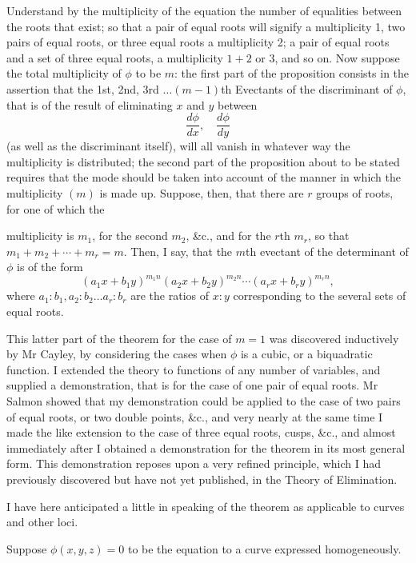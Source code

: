 \documentclass[11pt]{article}
\newcommand{\sourcepage}[1]{\marginpar{\scriptsize p.~#1}}
\begin{document}
{{Understand by the multiplicity of the equation the number of equalities between the roots that exist; so that a pair of equal roots will signify a multiplicity 1, two pairs of equal roots, or three equal roots a multiplicity 2; a pair of equal roots and a set of three equal roots, a multiplicity $1+2$ or 3, and so on. Now suppose the total multiplicity of $\phi$ to be $m$: the first part of the proposition consists in the assertion that the 1st, 2nd, 3rd $\ldots(m-1)$th Evectants of the discriminant of $\phi$, that is of the result of eliminating $x$ and $y$ between
\[
\frac{d\phi}{dx},\quad \frac{d\phi}{dy}
\]
(as well as the discriminant itself), will all vanish in whatever way the multiplicity is distributed; the second part of the proposition about to be stated requires that the mode should be taken into account of the manner in which the multiplicity $(m)$ is made up. Suppose, then, that there are $r$ groups of roots, for one of which the

\sourcepage{368}
multiplicity is $m_1$, for the second $m_2$, \&c., and for the $r$th $m_r$, so that $m_1+m_2+\cdots+m_r=m$. Then, I say, that the $m$th evectant of the determinant of $\phi$ is of the form
\[
(a_1x+b_1y)^{m_1n}(a_2x+b_2y)^{m_2n}\cdots(a_rx+b_ry)^{m_rn},
\]
where $a_1:b_1,a_2:b_2\ldots a_r:b_r$ are the ratios of $x:y$ corresponding to the several sets of equal roots.

This latter part of the theorem for the case of $m=1$ was discovered inductively by Mr Cayley, by considering the cases when $\phi$ is a cubic, or a biquadratic function. I extended the theory to functions of any number of variables, and supplied a demonstration, that is for the case of one pair of equal roots. Mr Salmon showed that my demonstration could be applied to the case of two pairs of equal roots, or two double points, \&c., and very nearly at the same time I made the like extension to the case of three equal roots, cusps, \&c., and almost immediately after I obtained a demonstration for the theorem in its most general form. This demonstration reposes upon a very refined principle, which I had previously discovered but have not yet published, in the Theory of Elimination.

I have here anticipated a little in speaking of the theorem as applicable to curves and other loci.

Suppose $\phi(x,y,z)=0$ to be the equation to a curve expressed homogeneously.

}}
\end{document}
